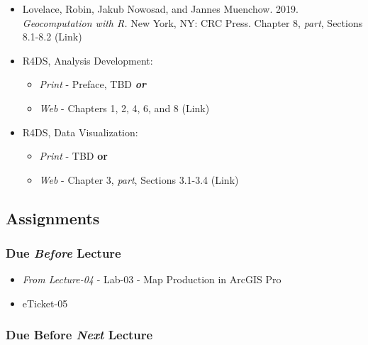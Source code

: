 \documentclass[]{book}
\providecommand{\tightlist}{%
  \setlength{\itemsep}{0pt}\setlength{\parskip}{0pt}}
\begin{document}
\begin{itemize}
\tightlist
\item
  Lovelace, Robin, Jakub Nowosad, and Jannes Muenchow. 2019. \emph{Geocomputation with R.} New York, NY: CRC Press. Chapter 8, \emph{part}, Sections 8.1-8.2 (Link)
\item
  R4DS, Analysis Development:

  \begin{itemize}
  \tightlist
  \item
    \emph{Print} - Preface, TBD \textbf{\emph{or}}
  \item
    \emph{Web} - Chapters 1, 2, 4, 6, and 8 (Link)
  \end{itemize}
\item
  R4DS, Data Visualization:

  \begin{itemize}
  \tightlist
  \item
    \emph{Print} - TBD \textbf{or}
  \item
    \emph{Web} - Chapter 3, \emph{part}, Sections 3.1-3.4 (Link)
  \end{itemize}
\end{itemize}

\hypertarget{assignments-6}{%
\subsection*{Assignments}\label{assignments-6}}

\hypertarget{due-before-lecture-4}{%
\subsubsection*{\texorpdfstring{Due \emph{Before} Lecture}{Due Before Lecture}}\label{due-before-lecture-4}}

\begin{itemize}
\tightlist
\item
  \emph{From Lecture-04} - Lab-03 - Map Production in ArcGIS Pro
\item
  eTicket-05
\end{itemize}

\hypertarget{due-before-next-lecture-3}{%
\subsubsection*{\texorpdfstring{Due Before \emph{Next} Lecture}{Due Before Next Lecture}}\label{due-before-next-lecture-3}}
\end{document}
